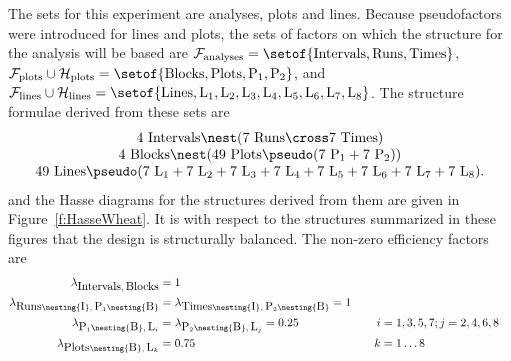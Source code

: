 The sets for this experiment are analyses, plots and lines. 
Because pseudofactors were introduced for lines and plots, the sets 
of factors on which 
the structure for the analysis will be based are 
${\cal F}_{\rm analyses} 
     = \setof{\mbox{Intervals}, \mbox{Runs}, \mbox{Times}}$, 
${\cal F}_{\rm plots} \cup {\cal H}_{\rm plots} 
     = \setof{\mbox{Blocks}, \mbox{Plots}, \mbox{P}_1, \mbox{P}_2}$, 
and ${\cal F}_{\rm lines} \cup {\cal H}_{\rm lines}
     = \setof{\mbox{Lines}, \mbox{L}_1, \mbox{L}_2, \mbox{L}_3, \mbox{L}_4, 
                            \mbox{L}_5, \mbox{L}_6, \mbox{L}_7, \mbox{L}_8}$.  
The structure formulae derived from these sets are 
\[\begin{array}{c}
  \mbox{4 Intervals} \nest (\mbox{7 Runs} \cross \mbox{7 Times}) \\
  \mbox{4 Blocks} \nest (\mbox{49 Plots} \pseudo (\mbox{7 P}_1 + \mbox{7 P}_2))  \\
  \mbox{49 Lines} \pseudo (\mbox{7 L}_1 + \mbox{7 L}_2 + \mbox{7 L}_3 
      + \mbox{7 L}_4 + \mbox{7 L}_5 + \mbox{7 L}_6 + \mbox{7 L}_7 + \mbox{7 L}_8).
\end{array}\]
and the Hasse diagrams for the structures derived from them are given in 
Figure~\ref{f:HasseWheat}. It is with respect to the structures summarized 
in these figures that the design is structurally balanced. 
The non-zero efficiency factors are
\begin{alignat*}{5}
   \lambda_{\mbox{Intervals},\:\mbox{Blocks}} & = 1                  \\
   \lambda_{\mbox{Runs} \nesting{\mbox{I}},\:\mbox{P}_1 \nesting{\mbox{B}}} & =
   \lambda_{\mbox{Times} \nesting{\mbox{I}},\:\mbox{P}_2 \nesting{\mbox{B}}} 
                                                        = 1         \\
   \lambda_{\mbox{P}_1 \nesting{\mbox{B}},\:\mbox{L}_i} & =
   \lambda_{\mbox{P}_2 \nesting{\mbox{B}},\:\mbox{L}_j} = 0.25
                                   & \quad i&=1,3,5,7; j=2,4,6,8      \\
   \lambda_{\mbox{Plots} \nesting{\mbox{B}},\:\mbox{L}_k} &= 0.75   
                                  & \quad k&=1\ldots 8
\end{alignat*}

